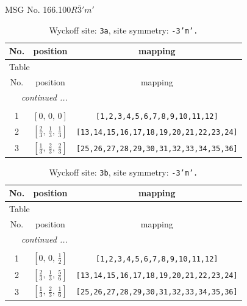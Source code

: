 \documentclass[fleqn,8pt]{jsarticle}
\begin{document}
\setcounter{MaxMatrixCols}{32}

\renewcommand{\tablename}{Table~}
\renewcommand{\figurename}{Figure~}
\begin{center}
\LARGE
MSG No. 166.100\quad$R\bar{3}'m'$
\end{center}
\renewcommand{\arraystretch}{1.2}
\begin{longtable}{ccc}
\caption{Wyckoff site: {\tt 3a}, site symmetry: {\tt -3'm'.}}
 \\
 \hline \hline
No. & position & mapping \\ \hline \endfirsthead

\multicolumn{2}{l}{\tablename\ \thetable{}} \\
 \hline \hline
No. & position & mapping \\ \hline \endhead

 \hline \hline
\multicolumn{2}{r}{\footnotesize\it continued ...} \\ \endfoot

 \hline \hline
\multicolumn{2}{r}{} \\ \endlastfoot

1 & $\left[ 0,\, 0,\, 0 \right]$ & {\tt [1,2,3,4,5,6,7,8,9,10,11,12]} \\ \hline
2 & $\left[ \frac{2}{3},\, \frac{1}{3},\, \frac{1}{3} \right]$ & {\tt [13,14,15,16,17,18,19,20,21,22,23,24]} \\ \hline
3 & $\left[ \frac{1}{3},\, \frac{2}{3},\, \frac{2}{3} \right]$ & {\tt [25,26,27,28,29,30,31,32,33,34,35,36]} \\
\end{longtable}
\renewcommand{\arraystretch}{1.2}
\begin{longtable}{ccc}
\caption{Wyckoff site: {\tt 3b}, site symmetry: {\tt -3'm'.}}
 \\
 \hline \hline
No. & position & mapping \\ \hline \endfirsthead

\multicolumn{2}{l}{\tablename\ \thetable{}} \\
 \hline \hline
No. & position & mapping \\ \hline \endhead

 \hline \hline
\multicolumn{2}{r}{\footnotesize\it continued ...} \\ \endfoot

 \hline \hline
\multicolumn{2}{r}{} \\ \endlastfoot

1 & $\left[ 0,\, 0,\, \frac{1}{2} \right]$ & {\tt [1,2,3,4,5,6,7,8,9,10,11,12]} \\ \hline
2 & $\left[ \frac{2}{3},\, \frac{1}{3},\, \frac{5}{6} \right]$ & {\tt [13,14,15,16,17,18,19,20,21,22,23,24]} \\ \hline
3 & $\left[ \frac{1}{3},\, \frac{2}{3},\, \frac{1}{6} \right]$ & {\tt [25,26,27,28,29,30,31,32,33,34,35,36]} \\
\end{longtable}
\end{document}
